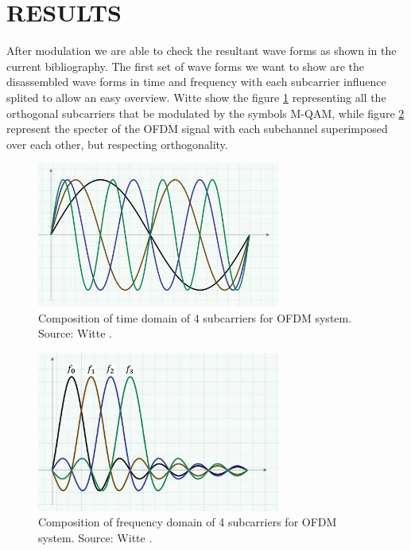 \section{RESULTS}

After modulation we are able to check the resultant wave forms as shown in the current bibliography. The first set of wave forms we want to show are the disassembled wave forms in time and frequency with each subcarrier influence splited to allow an easy overview. Witte \cite{ref6} show the figure \ref{fig:sin} representing all the orthogonal subcarriers that be modulated by the symbols M-QAM, while figure \ref{fig:sinc} represent the specter of the OFDM signal with each subchannel superimposed over each other, but respecting orthogonality.

\begin{figure}[h]
\begin{center}
\includegraphics[width=8cm]{images/sin_disassembled.png}
\caption{Composition of time domain of 4 subcarriers for OFDM system. Source: Witte \cite{ref6} .}
\label{fig:sin} 
\end{center}
\end{figure}

\begin{figure}[h]
\begin{center}
\includegraphics[width=8cm]{images/sinc_disassembled.png}
\caption{Composition of frequency domain of 4 subcarriers for OFDM system. Source: Witte \cite{ref6} .}
\label{fig:sinc} 
\end{center}
\end{figure}

